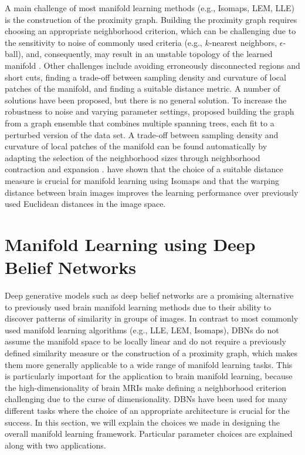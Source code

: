 A main challenge of most manifold learning methods (e.g., Isomaps, LEM, LLE) is
the construction of the proximity graph. Building the proximity graph requires
choosing an appropriate neighborhood criterion, which can be challenging due to
the sensitivity to noise of commonly used criteria (e.g., $k$-nearest neighbors,
$\epsilon$-ball), and, consequently, may result in an unstable topology of the
learned manifold \citep{balasubramanian2002}. Other challenges include avoiding
erroneously disconnected regions and short cuts, finding a trade-off between
sampling density and curvature of local patches of the manifold, and finding a
suitable distance metric. A number of solutions have been proposed, but there is
no general solution. To increase the robustness to noise and varying parameter
settings, \citet{carreira2005} proposed building the graph from a graph ensemble
that combines multiple spanning trees, each fit to a perturbed version of the
data set. A trade-off between sampling density and curvature of local patches of
the manifold can be found automatically by adapting the selection of the
neighborhood sizes through neighborhood contraction and expansion
\citep{zhang2012}. \citet{gerber2010} have shown that the choice of a suitable
distance measure is crucial for manifold learning using Isomaps and that the
warping distance between brain images improves the learning performance over
previously used Euclidean distances in the image space.

\section[Manifold learning using deep belief networks]{Manifold Learning using
Deep Belief Networks}

Deep generative models such as deep belief networks are a promising alternative
to previously used brain manifold learning methods due to their ability to
discover patterns of similarity in groups of images. In contrast to most
commonly used manifold learning algorithms (e.g., LLE, LEM, Isomaps), DBNs do
not assume the manifold space to be locally linear and do not require a
previously defined similarity measure or the construction of a proximity graph,
which makes them more generally applicable to a wide range of manifold learning
tasks. This is particularly important for the application to brain manifold
learning, because the high-dimensionality of brain MRIs make defining a
neighborhood criterion challenging due to the curse of dimensionality. DBNs have
been used for many different tasks where the choice of an appropriate
architecture is crucial for the success. In this section, we will explain the
choices we made in designing the overall manifold learning framework. Particular
parameter choices are explained along with two applications.

